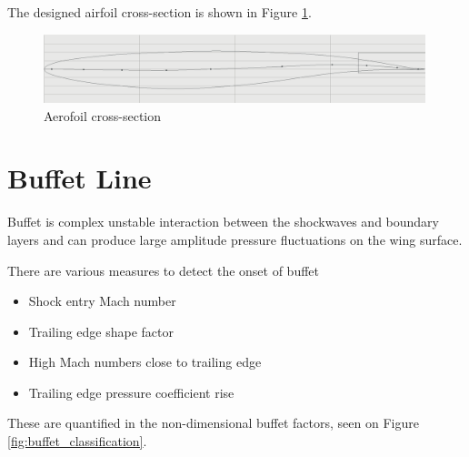 \documentclass{article}
\begin{document}


The designed airfoil cross-section is shown in Figure \ref{fig:airfoil}.



\begin{figure}[H]
    \centering
    \includegraphics[width=0.99\textwidth]{figures/airfoil.png}
    \caption{Aerofoil cross-section}
    \label{fig:airfoil}
\end{figure}

\section{Buffet Line}

Buffet is complex unstable interaction between the shockwaves and boundary layers and can produce large amplitude pressure fluctuations on the wing surface.

There are various measures to detect the onset of buffet
\begin{itemize}
    \item Shock entry Mach number
    \item Trailing edge shape factor
    \item High Mach numbers close to trailing edge
    \item Trailing edge pressure coefficient rise
\end{itemize}
These are quantified in the non-dimensional buffet factors, seen on Figure \ref{fig:buffet_classification}.
\end{document}
